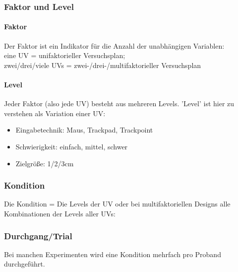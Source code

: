 			
			\subsubsection{Faktor und Level}
				\paragraph{Faktor}Der Faktor ist ein Indikator für die Anzahl der unabhängigen Variablen:\\
				eine UV = unifaktorieller Versuchsplan; \\ zwei/drei/viele UVs = zwei-/drei-/multifaktorieller Versuchsplan
				
				\paragraph{Level} Jeder Faktor (also jede UV) besteht aus mehreren Levels. 'Level' ist hier zu verstehen als Variation einer UV:
					\begin{itemize}
						\item Eingabetechnik: Maus, Trackpad, Trackpoint
						\item Schwierigkeit: einfach, mittel, schwer
						\item Zielgröße: 1/2/3cm
					\end{itemize}
				
			\subsubsection{Kondition}
				Die Kondition = Die Levels der UV oder bei multifaktoriellen Designs alle Kombinationen der
				Levels aller UVs:
				
			\subsubsection{Durchgang/Trial}
				Bei manchen Experimenten wird eine Kondition mehrfach pro Proband durchgeführt.
			
			
			
			
			
			
			
			
			
			
			
			
			
			
			
			
			